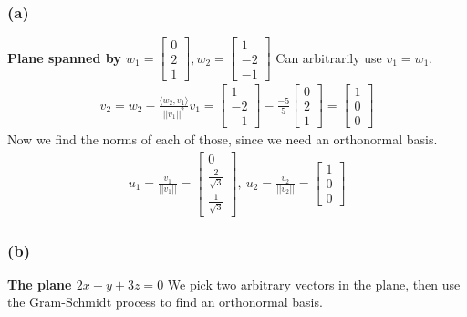 \documentclass[10pt,letterpaper]{article}
\begin{document}
	\subsubsection*{(a)} \textbf{Plane spanned by $w_1 = \begin{bmatrix}
		0 \\ 2 \\ 1
		\end{bmatrix}, w_2 = \begin{bmatrix}
		1 \\ -2 \\ -1
		\end{bmatrix}$} 
		Can arbitrarily use $v_1 = w_1$. 
		\begin{align*}
		v_2 = w_2 - \frac{\langle w_2 , v_1 \rangle}{||v_1||^2} v_1 = \begin{bmatrix}
		1 \\ -2 \\ -1
		\end{bmatrix} - \frac{-5}{5} \begin{bmatrix}
		0 \\ 2 \\ 1
		\end{bmatrix} = \begin{bmatrix}
		1 \\ 0 \\ 0
		\end{bmatrix}
		\end{align*}
		Now we find the norms of each of those, since we need an orthonormal basis. 
		\begin{align*}
		\boxed{u_1 = \frac{v_1}{||v_1||} = \begin{bmatrix}
			0 \\ \frac{2}{\sqrt{3}} \\ \frac{1}{\sqrt{3}}
			\end{bmatrix}, \: u_2 = \frac{v_2}{||v_2||}  = \begin{bmatrix}
			1 \\ 0 \\ 0
			\end{bmatrix} } 
		\end{align*}
	\subsubsection*{(b)} \textbf{The plane $2x - y + 3z = 0$}
	We pick two arbitrary vectors in the plane, then use the Gram-Schmidt process to find an orthonormal basis. 
	 
\end{document}
